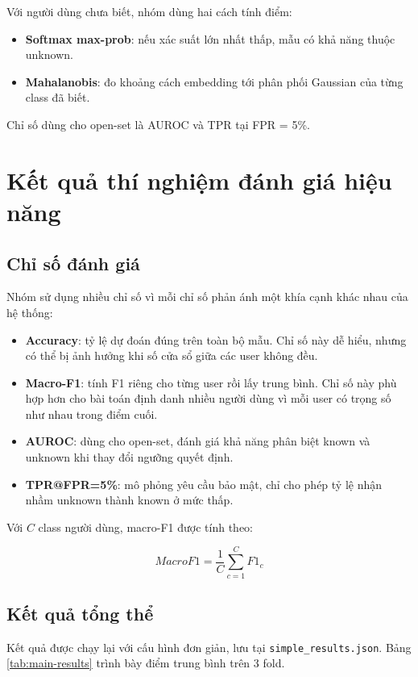 \documentclass[12pt,a4paper]{article}
\begin{document}
Với người dùng chưa biết, nhóm dùng hai cách tính điểm:

\begin{itemize}
    \item \textbf{Softmax max-prob}: nếu xác suất lớn nhất thấp, mẫu có khả năng thuộc unknown.
    \item \textbf{Mahalanobis}: đo khoảng cách embedding tới phân phối Gaussian của từng class đã biết.
\end{itemize}

Chỉ số dùng cho open-set là AUROC và TPR tại FPR = 5\%.

\section{Kết quả thí nghiệm đánh giá hiệu năng}

\subsection{Chỉ số đánh giá}

Nhóm sử dụng nhiều chỉ số vì mỗi chỉ số phản ánh một khía cạnh khác nhau của hệ thống:

\begin{itemize}
    \item \textbf{Accuracy}: tỷ lệ dự đoán đúng trên toàn bộ mẫu. Chỉ số này dễ hiểu, nhưng có thể bị ảnh hưởng khi số cửa sổ giữa các user không đều.
    \item \textbf{Macro-F1}: tính F1 riêng cho từng user rồi lấy trung bình. Chỉ số này phù hợp hơn cho bài toán định danh nhiều người dùng vì mỗi user có trọng số như nhau trong điểm cuối.
    \item \textbf{AUROC}: dùng cho open-set, đánh giá khả năng phân biệt known và unknown khi thay đổi ngưỡng quyết định.
    \item \textbf{TPR@FPR=5\%}: mô phỏng yêu cầu bảo mật, chỉ cho phép tỷ lệ nhận nhầm unknown thành known ở mức thấp.
\end{itemize}

Với \(C\) class người dùng, macro-F1 được tính theo:

\[
MacroF1 = \frac{1}{C}\sum_{c=1}^{C} F1_c
\]

\subsection{Kết quả tổng thể}

Kết quả được chạy lại với cấu hình đơn giản, lưu tại \texttt{simple\_results.json}. Bảng \ref{tab:main-results} trình bày điểm trung bình trên 3 fold.
\end{document}
